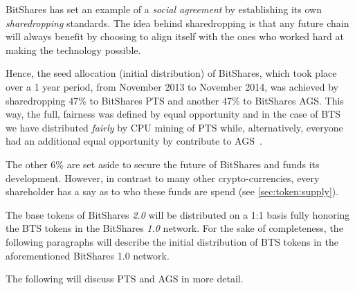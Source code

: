BitShares has set an example of a \emph{social agreement} by establishing its
own \emph{sharedropping} standards. The idea behind sharedropping is that any
future chain will always benefit by choosing to align itself with the ones who
worked hard at making the technology possible.

Hence, the seed allocation (initial distribution) of BitShares, which took
place over a 1 year period, from November 2013 to November 2014, was achieved
by sharedropping 47\% to BitShares PTS and another 47\% to BitShares AGS.
%
This way, the full, fairness was defined by equal opportunity and in the case
of BTS we have distributed \emph{fairly} by CPU mining of PTS while,
alternatively, everyone had an additional equal opportunity by contribute to
AGS~\cite{}.

The other 6\% are set aside to secure the future of BitShares and funds its
development. However, in contrast to many other crypto-currencies, every
shareholder has a say as to who these funds are spend (see
\cref{sec:token:supply}).

The base tokens of BitShares \emph{2.0} will be distributed on a 1:1 basis
fully honoring the BTS tokens in the BitShares \emph{1.0} network.  For the
sake of completeness, the following paragraphs will describe the initial
distribution of BTS tokens in the aforementioned BitShares 1.0 network.

The following will discuss PTS and AGS in more detail.
